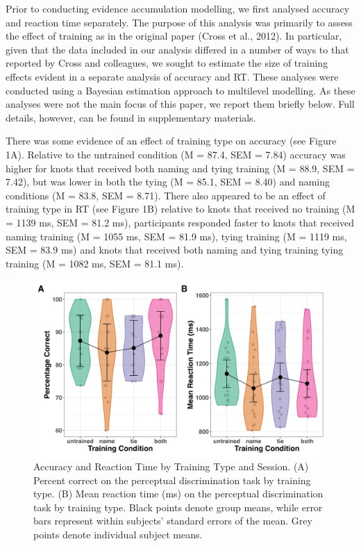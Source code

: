 \documentclass[
  man, donotrepeattitle,floatsintext]{apa6}
\begin{document}
Prior to conducting evidence accumulation modelling, we first analysed accuracy and reaction time separately. The purpose of this analysis was primarily to assess the effect of training as in the original paper (Cross et al., 2012). In particular, given that the data included in our analysis differed in a number of ways to that reported by Cross and colleagues, we sought to estimate the size of training effects evident in a separate analysis of accuracy and RT. These analyses were conducted using a Bayesian estimation approach to multilevel modelling. As these analyses were not the main focus of this paper, we report them briefly below. Full details, however, can be found in supplementary materials.

There was some evidence of an effect of training type on accuracy (see Figure 1A). Relative to the untrained condition (M = 87.4, SEM = 7.84) accuracy was higher for knots that received both naming and tying training (M = 88.9, SEM = 7.42), but was lower in both the tying (M = 85.1, SEM = 8.40) and naming conditions (M = 83.8, SEM = 8.71). There also appeared to be an effect of training type in RT (see Figure 1B) relative to knots that received no training (M = 1139 ms, SEM = 81.2 ms), participants responded faster to knots that received naming training (M = 1055 ms, SEM = 81.9 ms), tying training (M = 1119 ms, SEM = 83.9 ms) and knots that received both naming and tying training tying training (M = 1082 ms, SEM = 81.1 ms).



\begin{figure}[H]

{\centering \includegraphics[height=0.67\textheight,]{../figures/descriptive/violin_acc_rt} 

}

\caption{Accuracy and Reaction Time by Training Type and Session. (A) Percent correct on the perceptual discrimination task by training type. (B) Mean reaction time (ms) on the perceptual discrimination task by training type. Black points denote group means, while error bars represent within subjects' standard errors of the mean. Grey points denote individual subject means.}\label{fig:accuracy-rt-plot}
\end{figure}
\end{document}
